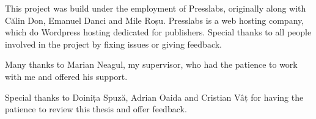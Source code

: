 \cleardoublepage

\begin{acknowledgements}

This project was build under the employment of Presslabs, originally along with Călin Don, Emanuel Danci and Mile Roșu. Presslabs is a web hosting company, which do Wordpress hosting dedicated for publishers. Special thanks to all people involved in the project by fixing issues or giving feedback.

Many thanks to Marian Neagul, my supervisor, who had the patience to work with me and offered his support.

Special thanks to Doinița Spuză, Adrian Oaida and Cristian Vâț for having the patience to review this thesis and offer feedback.

\end{acknowledgements}
